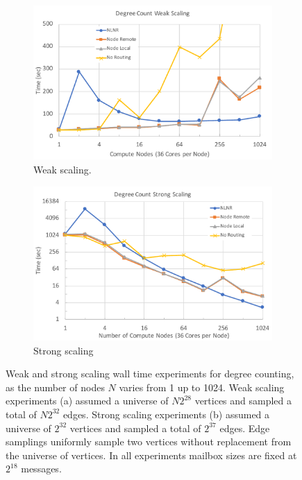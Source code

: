 \documentclass[10]{report}
\begin{document}
\begin{figure}
	\begin{center}
		\begin{subfigure}{0.49\linewidth}
			\centerline{\includegraphics[width=1.0\columnwidth]{degree_weak_scaling}}
			\caption{Weak scaling. \label{fig:degree_weak_scaling}}
		\end{subfigure}
		\begin{subfigure}{0.49\linewidth}
			\centerline{\includegraphics[width=1.0\columnwidth]{degree_strong_scaling}}
			\caption{Strong scaling \label{fig:degree_strong_scaling}}
		\end{subfigure}
		\caption{Weak and strong scaling wall time experiments for degree counting, as the number of nodes $N$ varies from 1 up to 1024.
			Weak scaling experiments (a) assumed a universe of $N2^{28}$ vertices and sampled a total of $N2^{32}$ edges.
			Strong scaling experiments (b) assumed a universe of $2^{32}$ vertices and sampled a total of $2^{37}$ edges. 
			Edge samplings uniformly sample two vertices without replacement from the universe of vertices.
			In all experiments mailbox sizes are fixed at $2^{18}$ messages.
			\label{fig:degree_scaling}}
	\end{center}
\end{figure}
\end{document}
